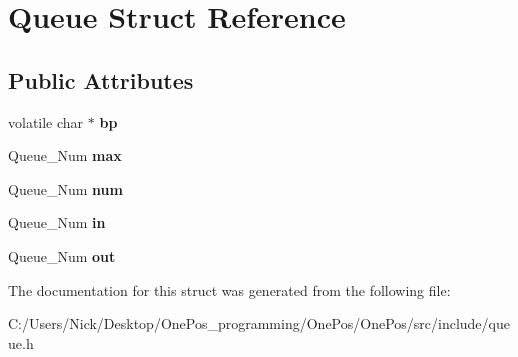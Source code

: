 \hypertarget{struct_queue}{\section{Queue Struct Reference}
\label{struct_queue}
}
\subsection*{Public Attributes}
\begin{DoxyCompactItemize}
\item 
\hypertarget{struct_queue_adacc524848e0d1137aec2d33ed71ccb6}{volatile char $\ast$ {\bfseries bp}}\label{struct_queue_adacc524848e0d1137aec2d33ed71ccb6}

\item 
\hypertarget{struct_queue_ad733c745fcd6d324e99a491d5d799f95}{Queue\-\_\-\-Num {\bfseries max}}\label{struct_queue_ad733c745fcd6d324e99a491d5d799f95}

\item 
\hypertarget{struct_queue_a8567067f3dc8049bfad32f515e72ed41}{Queue\-\_\-\-Num {\bfseries num}}\label{struct_queue_a8567067f3dc8049bfad32f515e72ed41}

\item 
\hypertarget{struct_queue_a1d380a52d63bda956119964f20b114b2}{Queue\-\_\-\-Num {\bfseries in}}\label{struct_queue_a1d380a52d63bda956119964f20b114b2}

\item 
\hypertarget{struct_queue_a173c0174814baf6be68e4564eec35d45}{Queue\-\_\-\-Num {\bfseries out}}\label{struct_queue_a173c0174814baf6be68e4564eec35d45}

\end{DoxyCompactItemize}


The documentation for this struct was generated from the following file\-:\begin{DoxyCompactItemize}
\item 
C\-:/\-Users/\-Nick/\-Desktop/\-One\-Pos\-\_\-programming/\-One\-Pos/\-One\-Pos/src/include/queue.\-h\end{DoxyCompactItemize}
